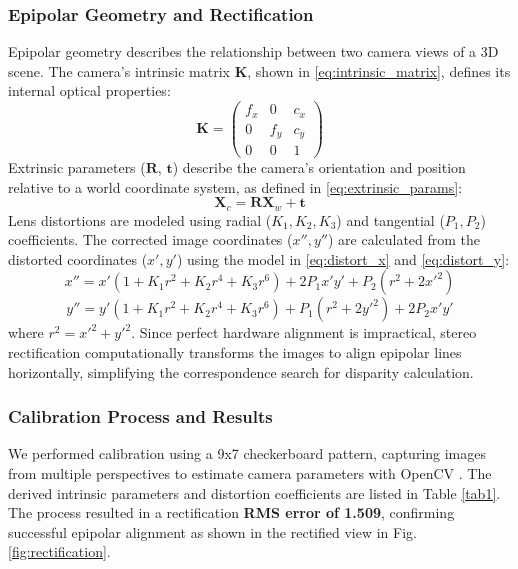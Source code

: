 \documentclass[conference]{IEEEtran}
\begin{document}
\subsubsection{Epipolar Geometry and Rectification}
Epipolar geometry describes the relationship between two camera views of a 3D scene. The camera's intrinsic matrix $\mathbf{K}$, shown in \eqref{eq:intrinsic_matrix}, defines its internal optical properties:
\begin{equation}
    \mathbf{K} = \begin{pmatrix} f_x & 0 & c_x \\ 0 & f_y & c_y \\ 0 & 0 & 1 \end{pmatrix}
    \label{eq:intrinsic_matrix}
\end{equation}
Extrinsic parameters ($\mathbf{R}$, $\mathbf{t}$) describe the camera's orientation and position relative to a world coordinate system, as defined in \eqref{eq:extrinsic_params}:
\begin{equation}
    \mathbf{X}_c = \mathbf{R}\mathbf{X}_w + \mathbf{t}
    \label{eq:extrinsic_params}
\end{equation}
Lens distortions are modeled using radial ($K_1, K_2, K_3$) and tangential ($P_1, P_2$) coefficients. The corrected image coordinates ($x'', y''$) are calculated from the distorted coordinates ($x', y'$) using the model in \eqref{eq:distort_x} and \eqref{eq:distort_y}:
\begin{equation}
    x'' = x'(1+K_1r^2+K_2r^4+K_3r^6)+2P_1x'y'+P_2(r^2+2x'^2)
    \label{eq:distort_x}
\end{equation}
\begin{equation}
    y'' = y'(1+K_1r^2+K_2r^4+K_3r^6)+P_1(r^2+2y'^2)+2P_2x'y'
    \label{eq:distort_y}
\end{equation}
where $r^2=x'^2+y'^2$. Since perfect hardware alignment is impractical, stereo rectification computationally transforms the images to align epipolar lines horizontally, simplifying the correspondence search for disparity calculation.



\subsubsection{Calibration Process and Results}
We performed calibration using a 9x7 checkerboard pattern, capturing images from multiple perspectives to estimate camera parameters with OpenCV \cite{zhang2002flexible, zhang1999flexible}. The derived intrinsic parameters and distortion coefficients are listed in Table \ref{tab1}. The process resulted in a rectification \textbf{RMS error of 1.509}, confirming successful epipolar alignment as shown in the rectified view in Fig. \ref{fig:rectification}.
\end{document}
